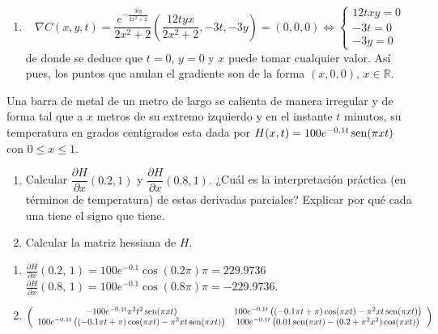 {\begin{enumerate}
\item
\[
\nabla C(x,y,t) =\frac{e^{-\frac{3ty}{2x^2+2}}}{2x^2+2}\left(\frac{12tyx}{2x^2+2}, -3t, -3y\right) = (0,0,0) \Leftrightarrow
\left\{
\begin{array}{l}
12txy =0 \\
-3t = 0\\
-3y = 0
\end{array}
\right.
\]
de donde se deduce que $t=0$, $y=0$ y $x$ puede tomar cualquier valor. Así pues, los puntos que anulan el gradiente son de la forma $(x,0,0)$, $x\in\mathbb{R}$.
\end{enumerate}
}


{Una barra de metal de un metro de largo se calienta de manera irregular y de forma tal que a $x$ metros de su extremo izquierdo y en el instante $t$ minutos, su temperatura en grados centígrados esta dada por $H(x,t) = 100e^{-0.1t}\operatorname{sen}(\pi xt)$ con $0\leq x \leq 1$.
\begin{enumerate}
\item Calcular $\dfrac{\partial H}{\partial x}(0.2, 1)$ y $\dfrac{\partial H}{\partial x}(0.8, 1).$ ¿Cuál es la interpretación práctica (en términos de temperatura) de estas derivadas parciales? Explicar por qué cada una tiene el signo que tiene.
\item Calcular la matriz hessiana de $H$.
\end{enumerate}
}
{\begin{enumerate}
\item $\frac{\partial H}{\partial x}(0.2,\, 1) = 100e^{-0.1}\cos(0.2\pi) \pi = 229.9736$ \\
$\frac{\partial H}{\partial x}(0.8,\, 1) = 100e^{-0.1}\cos(0.8\pi) \pi = -229.9736$.
\item $
\left(
\begin{array}{cc}
-100e^{-0.1t}\pi^2 t^2\operatorname{sen}(\pi xt) & 100e^{-0.1t}\left((-0.1\pi t+\pi)\cos(\pi xt) - \pi^2 xt \operatorname{sen}(\pi xt)\right) \\
100e^{-0.1t}\left((-0.1\pi t+\pi)\cos(\pi xt) - \pi^2 xt \operatorname{sen}(\pi xt)\right) & 100e^{-0.1t}\left(0.01\operatorname{sen}(\pi xt) -(0.2+\pi^2x^2) \cos(\pi xt)\right)
\end{array}
\right)$
\end{enumerate}
}
